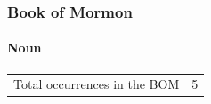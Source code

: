 						
						
						
						
						
						
		
	\subsubsection{Book of Mormon} %
		\label{MERIT-BOM}
		
		\paragraph{Noun}
	
			\begin{tabular}{ll}
				Total occurrences in the BOM & 5
			\end{tabular}
			

